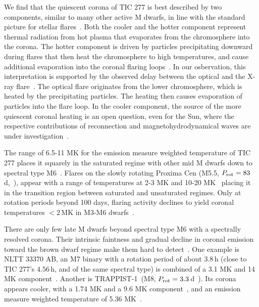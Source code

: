 \documentclass[twocolumn]{aastex631}
\begin{document}
We find that the quiescent corona of TIC 277 is best described by two components, similar to many other active M dwarfs, in line with the standard picture for stellar flares~\citep{wargelin2008xray, robrade2010quiescent, behr2023muscles, magaudda2022firsta}. Both the cooler and the hotter component represent thermal radiation from hot plasma that evaporates from the chromosphere into the corona. The hotter component is driven by particles precipitating downward during flares that then heat the chromosphere to high temperatures, and cause additional evaporation into the coronal flaring loops~\citep{benz2016flare}. In our osbervation, this interpretation is supported by the observed delay between the optical and the X-ray flare~\citep[Fig.~\ref{fig:lightcurves}, ][]{hawley2003multiwavelength}. The optical flare originates from the lower chromosphere, which is heated by the precipitating particles. The heating then causes evaporation of particles into the flare loop. In the cooler component, the source of the more quiescent coronal heating is an open question, even for the Sun, where the respective contributions of reconnection and magnetohydrodynamical waves are under investigation~\citep{vandoorsselaere2020coronal}.  %

The range of 6.5-11 MK for the emission measure weighted temperature of TIC 277 places it squarely in the saturated regime with other mid M dwarfs down to spectral type M6~\citep{wright2018stellar, magaudda2020relation, stelzer2022first,robrade2005xray,raassen2003xray,paudel2021simultaneous, foster2020corona}. Flares on the slowly rotating Proxima Cen (M5.5, $P_{\rm rot} = 83\,$d,~\citealt{anglada-escude2016terrestrial}), appear with a range of temperatures at 2-3 MK and 10-20 MK~\citep{gudel2004flares, fuhrmeister2011multiwavelength, fuhrmeister2022high, howard2022mouse} placing it in the transition region between saturated and unsaturated regimes. Only at rotation periods beyond 100 days, flaring activity declines to yield coronal temperatures $<2\,$MK in M3-M6 dwarfs~\citep{wright2018stellar, foster2020corona}. 

There are only few late M dwarfs beyond spectral type M6 with a spectrally resolved corona. Their intrinsic faintness and gradual decline in coronal emission toward the brown dwarf regime make them hard to detect~\citep{berger2010simultaneous, cook2014trends, stelzer2022first}. One example is NLTT 33370 AB, an M7 binary with a rotation period of about $3.8\,$h (close to TIC 277's $4.56\,$h, and of the same spectral type) is combined of a 3.1 MK and 14 MK component~\citep{williams2015simultaneous}. Another is TRAPPIST-1~(M8, $P_{\rm rot} = 3.3\,$d~\citep{luger2017sevenplanet}). Its corona appears cooler, with a 1.74 MK and a 9.6 MK component~\citep{wheatley2017strong}, and an emission measure weighted temperature of 5.36 MK~\citep{brown2023coronal}. 
\end{document}

